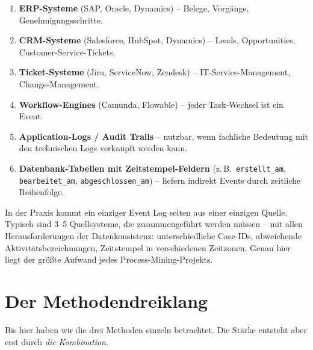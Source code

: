 \documentclass[11pt,a4paper,oneside]{article}
\newcommand{\fachbegriff}[1]{\textbf{#1}}
\begin{document}
\begin{enumerate}
  \item \fachbegriff{ERP-Systeme} (SAP, Oracle, Dynamics) -- Belege, Vorgänge, Genehmigungsschritte.
  \item \fachbegriff{CRM-Systeme} (Salesforce, HubSpot, Dynamics) -- Leads, Opportunities, Customer-Service-Tickets.
  \item \fachbegriff{Ticket-Systeme} (Jira, ServiceNow, Zendesk) -- IT-Service-Management, Change-Management.
  \item \fachbegriff{Workflow-Engines} (Camunda, Flowable) -- jeder Task-Wechsel ist ein Event.
  \item \fachbegriff{Application-Logs / Audit Trails} -- nutzbar, wenn fachliche Bedeutung mit den technischen Logs verknüpft werden kann.
  \item \fachbegriff{Datenbank-Tabellen mit Zeitstempel-Feldern} (z.\,B.\ \texttt{erstellt\_am}, \texttt{bearbeitet\_am}, \texttt{abgeschlossen\_am}) -- liefern indirekt Events durch zeitliche Reihenfolge.
\end{enumerate}

\begin{merkbox}
In der Praxis kommt ein einziger Event Log selten aus einer einzigen Quelle. Typisch sind 3--5 Quellsysteme, die zusammengeführt werden müssen -- mit allen Herausforderungen der Datenkonsistenz: unterschiedliche Case-IDs, abweichende Aktivitätsbezeichnungen, Zeitstempel in verschiedenen Zeitzonen. Genau hier liegt der größte Aufwand jedes Process-Mining-Projekts.
\end{merkbox}

\section{Der Methodendreiklang}

Bis hier haben wir die drei Methoden einzeln betrachtet. Die Stärke entsteht aber erst durch \emph{die Kombination}.
\end{document}
